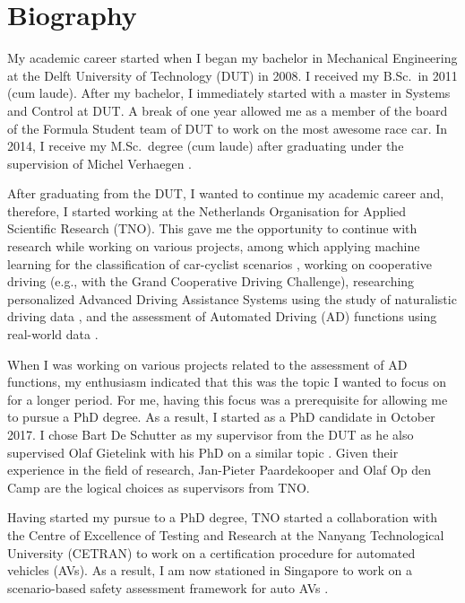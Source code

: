 \section{Biography}
\label{sec:bio}

My academic career started when I began my bachelor in Mechanical Engineering at the Delft University of Technology (DUT) in 2008. I received my B.Sc.\ in 2011 (cum laude). After my bachelor, I immediately started with a master in Systems and Control at DUT. A break of one year allowed me as a member of the board of the Formula Student team of DUT to work on the most awesome race car. In 2014, I receive my M.Sc.\ degree (cum laude) after graduating under the supervision of Michel Verhaegen \cite{deGelder2015sabre}.

After graduating from the DUT, I wanted to continue my academic career and, therefore, I started working at the Netherlands Organisation for Applied Scientific Research (TNO). This gave me the opportunity to continue with research while working on various projects, among which applying machine learning for the classification of car-cyclist scenarios \cite{cara2015carcyclist}, working on cooperative driving (e.g., with the Grand Cooperative Driving Challenge), researching personalized Advanced Driving Assistance Systems using the study of naturalistic driving data \cite{gelder2016pacc}, and the assessment of Automated Driving (AD) functions using real-world data \cite{deGelder2017assessment}.

When I was working on various projects related to the assessment of AD functions, my enthusiasm indicated that this was the topic I wanted to focus on for a longer period. For me, having this focus was a prerequisite for allowing me to pursue a PhD degree. As a result, I started as a PhD candidate in October 2017. I chose Bart De Schutter as my supervisor from the DUT as he also supervised Olaf Gietelink with his PhD on a similar topic \cite{gietelink2007phd}. Given their experience in the field of research, Jan-Pieter Paardekooper and Olaf Op den Camp are the logical choices as supervisors from TNO.

Having started my pursue to a PhD degree, TNO started a collaboration with the Centre of Excellence of Testing and Research at the Nanyang Technological University (CETRAN) to work on a certification procedure for automated vehicles (AVs). As a result, I am now stationed in Singapore to work on a scenario-based safety assessment framework for auto AVs \cite{ploeg2018cetran}.
